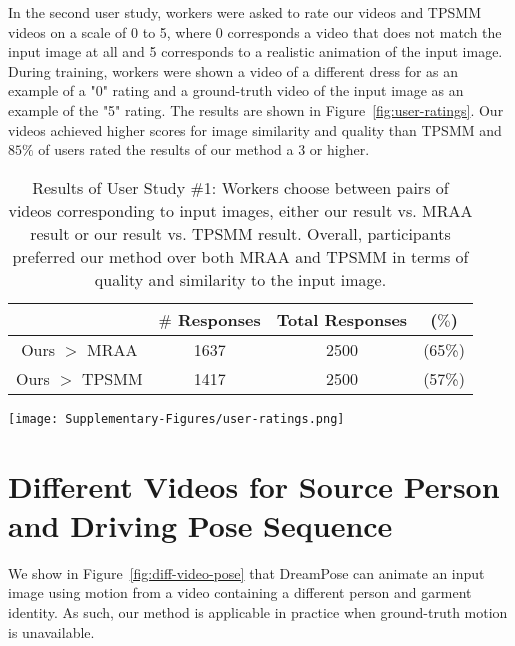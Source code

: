     In the second user study, workers were asked to rate our videos and TPSMM videos on a scale of 0 to 5, where 0 corresponds a video that does not match the input image at all and 5 corresponds to a realistic animation of the input image. During training, workers were shown a video of a different dress for as an example of a "0" rating and a ground-truth video of the input image as an example of the "5" rating. The results are shown in Figure~\ref{fig:user-ratings}. Our videos achieved higher scores for image similarity and quality than TPSMM and ${85\%}$ of users rated the results of our method a 3 or higher.
    
    \begin{table}[h!]
        \begin{center}
        \begin{tabular}{c c c c }
        \hline
        & $\#$ Responses & Total Responses & ($\%$) \\
        \hline\hline
        Ours $>$ MRAA \cite{articulated_animation} & 1637 & 2500 & (65\%)\\
        Ours $>$ TPSMM \cite{thin_plate_spline} & 1417 & 2500 & (57\%) \\
        \hline
        \end{tabular}
        \end{center}
        \caption{Results of User Study \#1: Workers choose between pairs of videos corresponding to input images, either our result vs. MRAA result or our result vs. TPSMM result. Overall, participants preferred our method over both MRAA and TPSMM in terms of quality and similarity to the input image.}
        \label{user-survey}
    \end{table}

    \begin{figure*}[h!]
        \begin{center}
            \texttt{[image: Supplementary-Figures/user-ratings.png]}
        \end{center}
       \caption{ Results of User Study \#2: Amazon Mechanical Turk worker ratings of our videos from 0 (video does not match input image) to 5 (video is a realistic animation of the input image). Overall, $85\%$ of workers rated our method a 3 or higher.}
    \label{fig:user-ratings}
    \end{figure*}

\section{Different Videos for Source Person and Driving Pose Sequence}
    We show in Figure~\ref{fig:diff-video-pose} that DreamPose can animate an input image using motion from a video containing a different person and garment identity. As such, our method is applicable in practice when ground-truth motion is unavailable.


